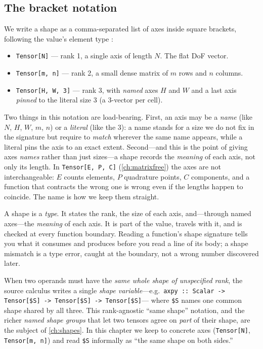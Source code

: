 \subsection{The bracket notation}
\label{sec:t-bracket}

We write a shape as a comma-separated list of axes inside square brackets,
following the value's element type :

\begin{itemize}[leftmargin=1.4em, nosep]
\item \lstinline[style=l4style]|Tensor[N]| --- rank 1, a single axis of length
$N$. The flat DoF vector.
\item \lstinline[style=l4style]|Tensor[m, n]| --- rank 2, a small dense matrix
of $m$ rows and $n$ columns.
\item \lstinline[style=l4style]|Tensor[H, W, 3]| --- rank 3, with \emph{named}
axes $H$ and $W$ and a last axis \emph{pinned} to the literal size $3$ (a
3-vector per cell).
\end{itemize}

\noindent Two things in this notation are load-bearing. First, an axis may be a
\emph{name} (like $N$, $H$, $W$, $m$, $n$) or a \emph{literal} (like the $3$): a
name stands for a size we do not fix in the signature but require to
\emph{match} wherever the same name appears, while a literal pins the axis to an
exact extent. Second---and this is the point of giving axes \emph{names} rather
than just sizes---a shape records the \emph{meaning} of each axis, not only its
length. In \lstinline[style=l4style]|Tensor[E, P, C]| (\cref{ch:matrixfree}) the
axes are not interchangeable: $E$ counts elements, $P$ quadrature points, $C$
components, and a function that contracts the wrong one is wrong even if the
lengths happen to coincide. The name is how we keep them straight.

\begin{keyidea}
A shape is a \emph{type}. It states the rank, the size of each axis, and---through
named axes---the \emph{meaning} of each axis. It is part of the value, travels
with it, and is checked at every function boundary. Reading a function's shape
signature tells you what it consumes and produces before you read a line of its
body; a shape mismatch is a type error, caught at the boundary, not a wrong
number discovered later.
\end{keyidea}

\begin{notationbox}
When two operands must have the \emph{same whole shape of unspecified rank}, the
source calculus writes a single \emph{shape variable}---e.g.\
\lstinline[style=l4style]|axpy :: Scalar -> Tensor[$S] -> Tensor[$S] -> Tensor[$S]|---%
where \lstinline[style=l4style]|$S| names one common shape shared by all three.
This rank-agnostic ``same shape'' notation, and the richer \emph{named shape
groups} that let two tensors agree on \emph{part} of their shape, are the subject
of \cref{ch:shapes}. In this chapter we keep to concrete axes
(\lstinline[style=l4style]|Tensor[N]|, \lstinline[style=l4style]|Tensor[m, n]|)
and read \lstinline[style=l4style]|$S| informally as ``the same shape on both
sides.''
\end{notationbox}

